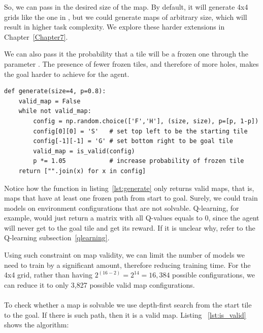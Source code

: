 So, we can pass in the desired size of the map. By default, it will generate 4x4 grids like the one in , but we could generate maps of arbitrary size, which will result in higher task complexity. We explore these harder extensions in Chapter~\ref{Chapter7}. 

We can also pass it the probability that a tile will be a frozen one through the parameter . The presence of fewer frozen tiles, and therefore of more holes, makes the goal harder to achieve for the agent.

\begin{minipage}{\linewidth}
\lstset{language=Python}
\lstset{frame=lines}
\lstset{basicstyle=\footnotesize}
\begin{lstlisting}
def generate(size=4, p=0.8):
    valid_map = False
    while not valid_map:
        config = np.random.choice(['F','H'], (size, size), p=[p, 1-p])
        config[0][0] = 'S'   # set top left to be the starting tile
        config[-1][-1] = 'G' # set bottom right to be goal tile
        valid_map = is_valid(config)
        p *= 1.05            # increase probability of frozen tile
    return ["".join(x) for x in config]
\end{lstlisting}
\end{minipage}

Notice how the  function in listing~\ref{lst:generate} only returns valid maps, that is, maps that have at least one frozen path from start to goal. Surely, we could train models on environment configurations that are not solvable. Q-learning, for example, would just return a  matrix with all Q-values equals to $0$, since the agent will never get to the goal tile and get its reward. If it is unclear why, refer to the Q-learning subsection~\ref{qlearning}.

Using such constraint on map validity, we can limit the number of models we need to train by a significant amount, therefore reducing training time. For the 4x4 grid, rather than having $2^{(16-2)}=2^{14}=16,384$ possible configurations, we can reduce it to only 3,827 possible valid map configurations.
\\\\
To check whether a map is solvable we use depth-first search from the start tile to the goal. If there is such path, then it is a valid map. Listing ~\ref{lst:is_valid} shows the algorithm:\\

